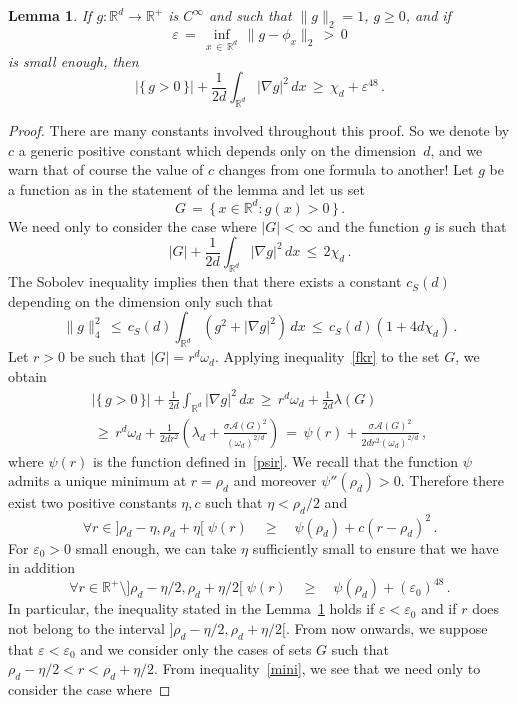\documentclass[10pt]{amsart}
\newtheorem{lemm}[theo]{Lemma}\newtheorem{prop}[theo]{Proposition}\newtheorem{coro}[theo]{Corollary}\newtheorem{conj}[theo]{Conjecture}
\theoremstyle{definition}\newtheorem{defi}[theo]{Definition}\newtheorem{rema}[theo]{Remark}\newtheorem{exam}[theo]{Example}\newtheorem{exem}[theo]{Example}\newtheorem{nota}[theo]{Notation}
\newcommand*\Rd {{\mathbb R^d}}
\newcommand*\R{\mathbb{R}}
\newcommand{\cA}{\mathcal{A}}
\let\oldforall\forall
\renewcommand*{\forall}{\mathrel{\oldforall}}
\begin{document}
\begin{lemm}\label{A1}
If $g:\Rd\to\R^+$ is $C^\infty$ and such that $\|g\|_2=1$, $g\geq 0$, and if
\[
\varepsilon\,=\,\inf_{x\,\in\,\Rd}\,\|g-\phi_x\|_2\,>\,0
\]
is small enough, then
\[
\big|\{\,g>0\,\}\big|+\frac{1}{2d}
\int_{\Rd}\big|\nabla g\big|^2\,dx\,\geq\,\chi_d+\varepsilon^{48}\,.
\]
\end{lemm}
\begin{proof}
There are many constants involved throughout this proof. So we denote by $c$ a generic positive constant which depends only on the dimension~$d$, and we warn that of course the value of $c$ changes from one formula to another! Let $g$ be a function as in the statement of the lemma and let us set
\[
G\,=\,\big\{\,x\in \Rd:g(x)>0\,\big\}\,.
\]
We need only to consider the case where $|G|<\infty$ and the function $g$ is such that
\[
\big|G\big|+\frac{1}{2d}
\int_{\Rd}\big|\nabla g\big|^2\,dx\,\leq\,2\chi_d\,.
\]
The Sobolev inequality implies then that there exists a constant $c_S(d)$ depending on the dimension only such that
\begin{equation}\label{aob}
\|g\|_4^2\,\leq\,c_S(d)
\int_{\Rd}\left(g^2+\big|\nabla g\big|^2\right)\,dx\,\leq\,c_S(d)(1+4d\chi_d)\,.
\end{equation}
Let $r>0$ be such that $|G|=r^d\omega_d$. Applying inequality~\eqref{fkr} to the set $G$, we obtain
\begin{multline}\label{sati}
\big|\{\,g>0\,\}\big|+\frac{1}{2d}
\int_{\Rd}\big|\nabla g\big|^2\,dx\,\geq\, r^d\omega_d+
\frac{1}{2d}\lambda(G)\\
\,\geq\, r^d\omega_d+
\frac{1}{2dr^{2}}\left(\lambda_d+
\frac{ \sigma\cA(G)^2 }{(\omega_d)^{2/d}}
\right)
\,=\,
\psi(r)+
\frac{ \sigma\cA(G)^2 }{ {2dr^{2} (\omega_d)^{2/d}} }\,,
\end{multline}
where $\psi(r)$ is the function defined in~\eqref{psir}. We recall that the function $\psi$ admits a unique minimum at $r=\rho_d$ and moreover $\psi''(\rho_d)>0$. Therefore there exist two positive constants $\eta,c$ such that $\eta<\rho_d/2$ and
\begin{equation}\label{mini}
\forall r\in]\rho_d-\eta,\rho_d+\eta[\;
\psi(r)\quad\geq \quad\psi(\rho_d)+c(r-\rho_d)^2\,.
\end{equation}
For $\varepsilon_0>0$ small enough, we can take $\eta$ sufficiently small to ensure that we have in addition
\[
\forall r\in \R^+\setminus]\rho_d-\eta/2,\rho_d+\eta/2[\;
\psi(r)\quad\geq\quad
\psi(\rho_d)+
(\varepsilon_0)^{48}\,.
\]
In particular, the inequality stated in the Lemma~\ref{A1} holds if $\varepsilon<\varepsilon_0$ and if $r$ does not belong to the interval $]\rho_d-\eta/2,\rho_d+\eta/2[$. From now onwards, we suppose that $\varepsilon<\varepsilon_0$ and we consider only the cases of sets $G$ such that $\rho_d-\eta/2< r<\rho_d+\eta/2$. From inequality~\eqref{mini}, we see that we need only to consider the case where

\end{proof}
\end{document}
